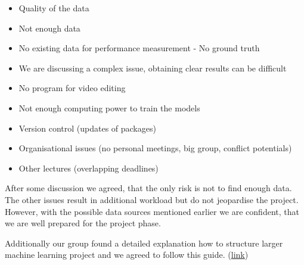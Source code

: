 \documentclass[a4paper,DIV=calc,11pt]{scrartcl}
\begin{document}
\begin{itemize}
    \item Quality of the data
    \item Not enough data
    \item No existing data for performance measurement - No ground truth
    \item We are discussing a complex issue, obtaining clear results can be difficult
    \item No program for video editing
    \item Not enough computing power to train the models
    \item Version control (updates of packages)
    \item Organisational issues (no personal meetings, big group, conflict potentials)
    \item Other lectures (overlapping deadlines)
\end{itemize}

After some discussion we agreed, that the only risk is not to find enough data. The other issues result in additional workload but do not jeopardise the project. However, with the possible data sources mentioned earlier we are confident, that we are well prepared for the project phase.

Additionally our group found a detailed explanation how to structure larger machine learning project and we agreed to follow this guide. (\href{https://www.jeremyjordan.me/ml-projects-guide/}{link})\\





\begin{figure}[ht]
\end{figure}
\end{document}
